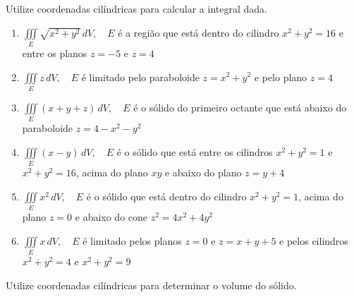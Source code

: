 



	
	
	\vspace{5mm}
	
	Utilize coordenadas cilíndricas para calcular a integral dada.
	
	\begin{enumerate}
		
		\item $\displaystyle \iiint \limits_{E} \sqrt{x^2 + y^2} \, dV, \quad E$ é a região que está dentro do cilindro $x^2 + y^2 = 16$ e entre os planos $z = -5$ e $z = 4$
		\resposta{$384\pi$}
		
		\item $\displaystyle \iiint \limits_{E} z \, dV, \quad E$ é limitado pelo paraboloide $z = x^2 + y^2$ e pelo plano $z = 4$
		
		\item $\displaystyle \iiint \limits_{E} (x + y + z) \, dV, \quad E$ é o sólido do primeiro octante que está abaixo do paraboloide $z = 4 - x^2 - y^2$
		
		\item $\displaystyle \iiint \limits_{E} (x - y) \, dV, \quad E$ é o sólido que está entre os cilindros $x^2 + y^2 = 1$ e $x^2 + y^2 = 16$, acima do plano $xy$ e abaixo do plano $z = y + 4$
		
		\item $\displaystyle \iiint \limits_{E} x^2 \, dV, \quad E$ é o sólido que está dentro do cilindro $x^2 + y^2 = 1$, acima do plano $z = 0$ e abaixo do cone $z^2 = 4x^2 + 4y^2$
		
		\item $\displaystyle \iiint \limits_{E} x \, dV, \quad E$ é limitado pelos planos $z = 0$ e $z = x + y + 5$ e pelos cilindros $x^2 + y^2 = 4$ e $x^2 + y^2 = 9$
	
	\end{enumerate}
	
	\vspace{5mm}
	
	Utilize coordenadas cilíndricas para determinar o volume do sólido.	
	

